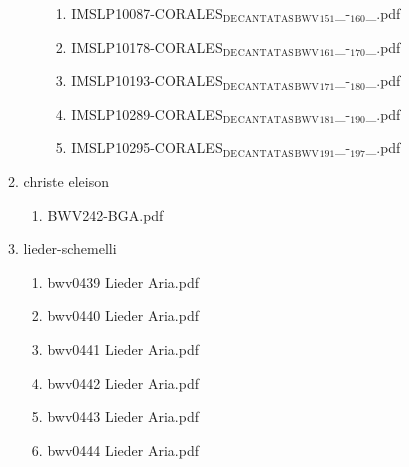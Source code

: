 \documentclass[11pt]{article}
\begin{document}
\begin{enumerate}
\begin{enumerate}
\begin{enumerate}
\begin{enumerate}
\item IMSLP10087-CORALES$_{\text{DE}}$$_{\text{CANTATAS}}$$_{\text{BWV}}$$_{\text{151}}$\_-$_{\text{160}}$\_.pdf
\label{sec-1-1-1-1-44-6-7-2-5-17}

\item IMSLP10178-CORALES$_{\text{DE}}$$_{\text{CANTATAS}}$$_{\text{BWV}}$$_{\text{161}}$\_-$_{\text{170}}$\_.pdf
\label{sec-1-1-1-1-44-6-7-2-5-18}

\item IMSLP10193-CORALES$_{\text{DE}}$$_{\text{CANTATAS}}$$_{\text{BWV}}$$_{\text{171}}$\_-$_{\text{180}}$\_.pdf
\label{sec-1-1-1-1-44-6-7-2-5-19}

\item IMSLP10289-CORALES$_{\text{DE}}$$_{\text{CANTATAS}}$$_{\text{BWV}}$$_{\text{181}}$\_-$_{\text{190}}$\_.pdf
\label{sec-1-1-1-1-44-6-7-2-5-20}

\item IMSLP10295-CORALES$_{\text{DE}}$$_{\text{CANTATAS}}$$_{\text{BWV}}$$_{\text{191}}$\_-$_{\text{197}}$\_.pdf
\label{sec-1-1-1-1-44-6-7-2-5-21}
\end{enumerate}
\end{enumerate}

\item christe eleison
\label{sec-1-1-1-1-44-6-7-3}
\begin{enumerate}
\item BWV242-BGA.pdf
\label{sec-1-1-1-1-44-6-7-3-1}
\end{enumerate}

\item lieder-schemelli
\label{sec-1-1-1-1-44-6-7-4}
\begin{enumerate}
\item bwv0439   Lieder Aria.pdf
\label{sec-1-1-1-1-44-6-7-4-1}

\item bwv0440   Lieder Aria.pdf
\label{sec-1-1-1-1-44-6-7-4-2}

\item bwv0441   Lieder Aria.pdf
\label{sec-1-1-1-1-44-6-7-4-3}

\item bwv0442   Lieder Aria.pdf
\label{sec-1-1-1-1-44-6-7-4-4}

\item bwv0443   Lieder Aria.pdf
\label{sec-1-1-1-1-44-6-7-4-5}

\item bwv0444   Lieder Aria.pdf
\label{sec-1-1-1-1-44-6-7-4-6}


\end{enumerate}
\end{enumerate}
\end{enumerate}
\end{document}
